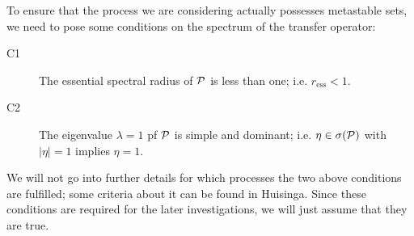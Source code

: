 To ensure that the process we are considering actually possesses metastable sets, we need to pose some conditions on the spectrum of the transfer operator:

\begin{description}
    \item[C1] The essential spectral radius of $\mathcal{P}$ is less than one; i.e. $r_{\mathrm{ess}} < 1$.
    \item[C2] The eigenvalue $\lambda=1$ pf $\mathcal{P}$ is simple and dominant; i.e. $\eta \in \sigma(\mathcal{P})$ with $|\eta| = 1$ implies $\eta = 1$.
\end{description}
We will not go into further details for which processes the two above conditions are fulfilled; 
some criteria about it can be found in Huisinga\cite{huisinga2001metastability}.
Since these conditions are required for the later investigations, we will just assume that they are true.

